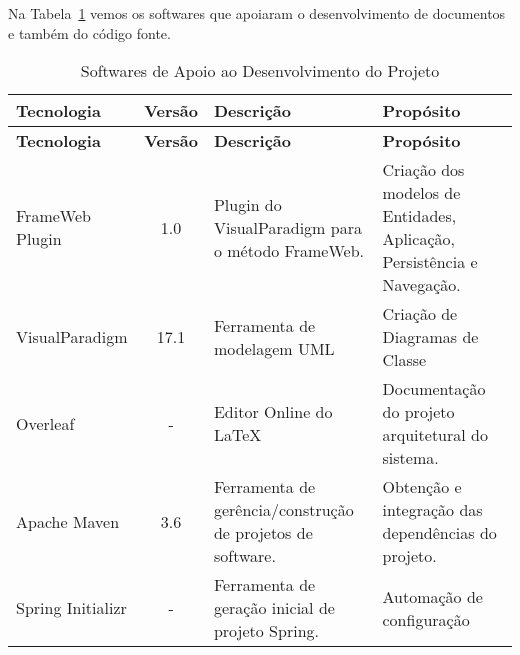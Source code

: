 
Na Tabela~\ref{tabela-software} vemos os softwares que apoiaram o desenvolvimento de documentos e também do código fonte.

\begin{footnotesize}
\begin{longtable}{|p{2.5cm}|c|p{5cm}|p{5.5cm}|}
	\caption{Softwares de Apoio ao Desenvolvimento do Projeto}	
	\label{tabela-software}\\\hline
	
	\rowcolor{lightgray}
	\textbf{Tecnologia} & \textbf{Versão} & \textbf{Descrição} & \textbf{Propósito} \\\hline 
	\endfirsthead
	\hline
	\rowcolor{lightgray}
	\textbf{Tecnologia} & \textbf{Versão} & \textbf{Descrição} & \textbf{Propósito} \\\hline 
	\endhead
	 
	FrameWeb Plugin & 1.0 & Plugin do VisualParadigm para o método FrameWeb. & Criação dos modelos de Entidades, Aplicação, Persistência e Navegação. \\\hline

    VisualParadigm & 17.1 & Ferramenta de modelagem UML & Criação de Diagramas de Classe  \\\hline

	Overleaf  & - & Editor Online do \LaTeX & Documentação do projeto arquitetural do sistema. \\\hline           
	
	Apache Maven & 3.6 & Ferramenta de gerência/construção de projetos de software. & Obtenção e integração das dependências do projeto. \\\hline
	
	Spring Initializr & - & Ferramenta de geração inicial de projeto Spring. & Automação de configuração \\\hline
 
\end{longtable}
\end{footnotesize}
